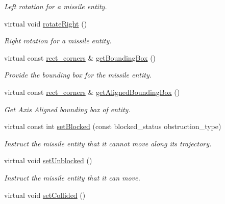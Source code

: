 \begin{DoxyCompactItemize}
\begin{DoxyCompactList}\small\item\em Left rotation for a missile entity. \end{DoxyCompactList}\item 
\hypertarget{class_missile_aeccfdf94a02fa86545296f4c38857ef8}{virtual void \hyperlink{class_missile_aeccfdf94a02fa86545296f4c38857ef8}{rotate\+Right} ()}\label{class_missile_aeccfdf94a02fa86545296f4c38857ef8}

\begin{DoxyCompactList}\small\item\em Right rotation for a missile entity. \end{DoxyCompactList}\item 
\hypertarget{class_missile_a6f9a14b7e2a2041fbccb566bf2a3b469}{virtual const \hyperlink{structrect__corners}{rect\+\_\+corners} \& \hyperlink{class_missile_a6f9a14b7e2a2041fbccb566bf2a3b469}{get\+Bounding\+Box} ()}\label{class_missile_a6f9a14b7e2a2041fbccb566bf2a3b469}

\begin{DoxyCompactList}\small\item\em Provide the bounding box for the missile entity. \end{DoxyCompactList}\item 
\hypertarget{class_missile_af2a9b1f8503cc2d322f5ab6ea788d393}{virtual const \hyperlink{structrect__corners}{rect\+\_\+corners} \& \hyperlink{class_missile_af2a9b1f8503cc2d322f5ab6ea788d393}{get\+Aligned\+Bounding\+Box} ()}\label{class_missile_af2a9b1f8503cc2d322f5ab6ea788d393}

\begin{DoxyCompactList}\small\item\em Get Axis Aligned bounding box of entity. \end{DoxyCompactList}\item 
\hypertarget{class_missile_a4f6e73f8d9f9723a777875efcb9edfa7}{virtual const int \hyperlink{class_missile_a4f6e73f8d9f9723a777875efcb9edfa7}{set\+Blocked} (const blocked\+\_\+status obstruction\+\_\+type)}\label{class_missile_a4f6e73f8d9f9723a777875efcb9edfa7}

\begin{DoxyCompactList}\small\item\em Instruct the missile entity that it cannot move along its trajectory. \end{DoxyCompactList}\item 
virtual void \hyperlink{class_missile_af66d762c4401061f64bcf9b46343c967}{set\+Unblocked} ()
\begin{DoxyCompactList}\small\item\em Instruct the missile entity that it can move. \end{DoxyCompactList}\item 
\hypertarget{class_missile_a1a27cc48265f34e3298c780c37ca8a0e}{virtual void \hyperlink{class_missile_a1a27cc48265f34e3298c780c37ca8a0e}{set\+Collided} ()}\label{class_missile_a1a27cc48265f34e3298c780c37ca8a0e}


\end{DoxyCompactItemize}

